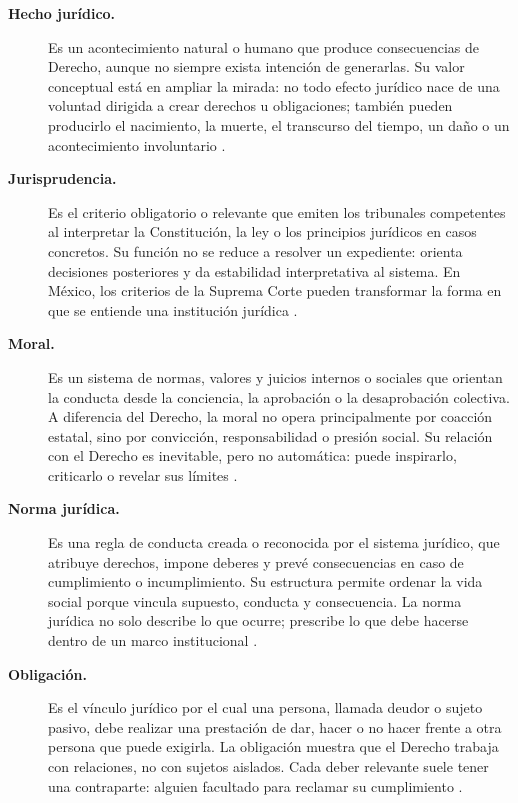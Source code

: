 \documentclass[
	spanish,
	letterpaper, oneside
]{article}
\begin{document}
\begin{description}
\item[\textbf{Hecho jurídico.}]
Es un acontecimiento natural o humano que produce consecuencias de Derecho, aunque no siempre exista intención de generarlas. Su valor conceptual está en ampliar la mirada: no todo efecto jurídico nace de una voluntad dirigida a crear derechos u obligaciones; también pueden producirlo el nacimiento, la muerte, el transcurso del tiempo, un daño o un acontecimiento involuntario \citep{garciaMaynez2002,poderJudicialGto2007}.

\item[\textbf{Jurisprudencia.}]
Es el criterio obligatorio o relevante que emiten los tribunales competentes al interpretar la Constitución, la ley o los principios jurídicos en casos concretos. Su función no se reduce a resolver un expediente: orienta decisiones posteriores y da estabilidad interpretativa al sistema. En México, los criterios de la Suprema Corte pueden transformar la forma en que se entiende una institución jurídica \citep{garciaMaynez2002,scjnMatrimonio2015}.

\item[\textbf{Moral.}]
Es un sistema de normas, valores y juicios internos o sociales que orientan la conducta desde la conciencia, la aprobación o la desaprobación colectiva. A diferencia del Derecho, la moral no opera principalmente por coacción estatal, sino por convicción, responsabilidad o presión social. Su relación con el Derecho es inevitable, pero no automática: puede inspirarlo, criticarlo o revelar sus límites \citep{launDerechoMoral2021,garciaMaynez2002}.

\item[\textbf{Norma jurídica.}]
Es una regla de conducta creada o reconocida por el sistema jurídico, que atribuye derechos, impone deberes y prevé consecuencias en caso de cumplimiento o incumplimiento. Su estructura permite ordenar la vida social porque vincula supuesto, conducta y consecuencia. La norma jurídica no solo describe lo que ocurre; prescribe lo que debe hacerse dentro de un marco institucional \citep{garciaMaynez2002,poderJudicialGto2007}.

\item[\textbf{Obligación.}]
Es el vínculo jurídico por el cual una persona, llamada deudor o sujeto pasivo, debe realizar una prestación de dar, hacer o no hacer frente a otra persona que puede exigirla. La obligación muestra que el Derecho trabaja con relaciones, no con sujetos aislados. Cada deber relevante suele tener una contraparte: alguien facultado para reclamar su cumplimiento \citep{poderJudicialGto2007,garciaMaynez2002}.


\end{description}
\end{document}
